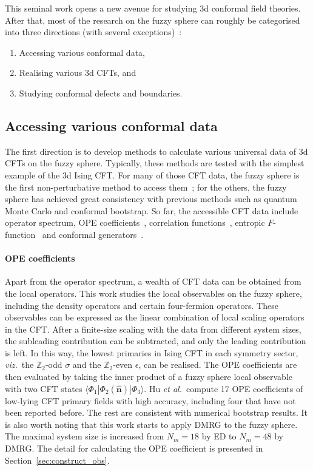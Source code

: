 \documentclass{timesjhep}
\begin{document}
This seminal work opens a new avenue for studying 3d conformal field theories. After that, most of the research on the fuzzy sphere can roughly be categorised into three directions (with several exceptions)~:

\begin{enumerate}
    \item Accessing various conformal data,
    \item Realising various 3d CFTs, and
    \item Studying conformal defects and boundaries.
\end{enumerate}

\subsection{Accessing various conformal data}

The first direction is to develop methods to calculate various universal data of 3d CFTs on the fuzzy sphere. Typically, these methods are tested with the simplest example of the 3d Ising CFT. For many of those CFT data, the fuzzy sphere is the first non-perturbative method to access them~; for the others, the fuzzy sphere has achieved great consistency with previous methods such as quantum Monte Carlo and conformal bootstrap. So far, the accessible CFT data include operator spectrum, OPE coefficients~\cite{Hu2023Mar}, correlation functions~\cite{Han2023Jun}, entropic $F$-function~\cite{Hu2024} and conformal generators~\cite{Fardelli2024,Fan2024}.

\paragraph{OPE coefficients~\cite{Hu2023Mar}}

Apart from the operator spectrum, a wealth of CFT data can be obtained from the local operators. This work studies the local observables on the fuzzy sphere, including the density operators and certain four-fermion operators. These observables can be expressed as the linear combination of local scaling operators in the CFT. After a finite-size scaling with the data from different system sizes, the subleading contribution can be subtracted, and only the leading contribution is left. In this way, the lowest primaries in Ising CFT in each symmetry sector, \textit{viz.}~the $\mathbb{Z}_2$-odd $\sigma$ and the $\mathbb{Z}_2$-even $\epsilon$, can be realised. The OPE coefficients are then evaluated by taking the inner product of a fuzzy sphere local observable with two CFT states $\langle\Phi_1|\Phi_2(\hat{\mathbf{n}})|\Phi_3\rangle$. Hu \textit{et al.}~compute 17 OPE coefficients of low-lying CFT primary fields with high accuracy, including four that have not been reported before. The rest are consistent with numerical bootstrap results. It is also worth noting that this work starts to apply DMRG to the fuzzy sphere. The maximal system size is increased from $N_m=18$ by ED to $N_m=48$ by DMRG. The detail for calculating the OPE coefficient is presented in Section~\ref{sec:construct_obs}.
\end{document}
